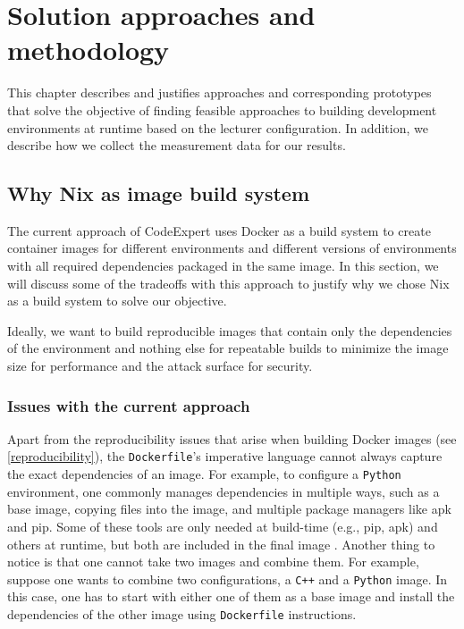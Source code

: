 \def\Cplusplus{C\raisebox{0.5ex}{\tiny\textbf{++}}}
\chapter{Solution approaches and methodology}\label{methodology}
This chapter describes and justifies approaches and corresponding prototypes that solve the objective of finding feasible approaches to building development environments at runtime based on the lecturer configuration. In addition, we describe how we collect the measurement data for our results. 
\section{Why Nix as image build system}
The current approach of CodeExpert uses Docker as a build system to create container images for different environments and different versions of environments with all required dependencies packaged in the same image. In this section, we will discuss some of the tradeoffs with this approach to justify why we chose Nix as a build system to solve our objective.

Ideally, we want to build reproducible images that contain only the dependencies of the environment and nothing else for repeatable builds to minimize the image size for performance and the attack surface for security. 
\subsection{Issues with the current approach}\label{reproducibility-docker-build}
Apart from the reproducibility issues that arise when building Docker images (see \ref{reproducibility}), the \verb|Dockerfile|'s imperative language cannot always capture the exact dependencies of an image. For example, to configure a \verb|Python| environment, one commonly manages dependencies in multiple ways, such as a base image, copying files into the image, and multiple package managers like apk and pip. Some of these tools are only needed at build-time (e.g., pip, apk) and others at runtime, but both are included in the final image \cite{Wagner2021}. Another thing to notice is that one cannot take two images and combine them. For example, suppose one wants to combine two configurations, a \verb|C++| and a \verb|Python| image. In this case, one has to start with either one of them as a base image and install the dependencies of the other image using \verb|Dockerfile| instructions.

